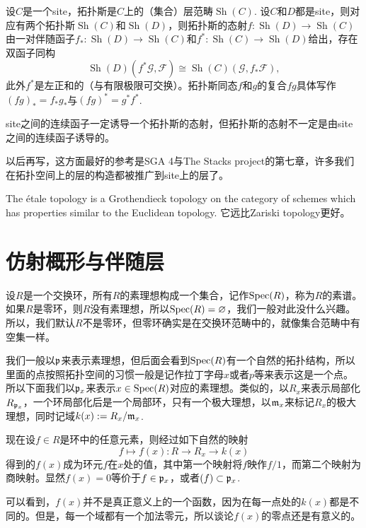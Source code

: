\begin{para}[拓扑斯]
	设$C$是一个site，拓扑斯是$C$上的（集合）层范畴$\operatorname{Sh}(C)$. 设$C$和$D$都是site，则对应有两个拓扑斯$\operatorname{Sh}(C)$和$\operatorname{Sh}(D)$，则拓扑斯的态射$f:\operatorname{Sh}(D)\to \operatorname{Sh}(C)$由一对伴随函子$f_*:\operatorname{Sh}(D)\to \operatorname{Sh}(C)$和$f^*:\operatorname{Sh}(C)\to \operatorname{Sh}(D)$给出，存在双函子同构
	\[
		\operatorname{Sh}(D)(f^*\mathcal G,\mathcal F)\cong \operatorname{Sh}(C)(\mathcal G,f_*\mathcal F),
	\]
	此外$f^*$是左正和的（与有限极限可交换）。拓扑斯同态$f$和$g$的复合$fg$具体写作$(fg)_*=f_* g_*$与$(fg)^*=g^*f^*$.
\end{para}

site之间的连续函子一定诱导一个拓扑斯的态射，但拓扑斯的态射不一定是由site之间的连续函子诱导的。

\vspace{2cm}

以后再写，这方面最好的参考是SGA 4与The Stacks project的第七章，许多我们在拓扑空间上的层的构造都被推广到site上的层了。

The étale topology is a Grothendieck topology on the category of schemes which has properties similar to the Euclidean topology. 它远比Zariski topology更好。

\section{仿射概形与伴随层}

\para 设$R$是一个交换环，所有$R$的素理想构成一个集合，记作$\operatorname{Spec}(R)$，称为$R$的素谱。如果$R$是零环，则$R$没有素理想，所以$\operatorname{Spec}(R)=\varnothing$，我们一般对此没什么兴趣。所以，我们默认$R$不是零环，但零环确实是在交换环范畴中的，就像集合范畴中有空集一样。

我们一般以$\mathfrak{p}$来表示素理想，但后面会看到$\operatorname{Spec}(R)$有一个自然的拓扑结构，所以里面的点按照拓扑空间的习惯一般是记作拉丁字母$x$或者$p$等来表示这是一个点。所以下面我们以$\mathfrak{p}_x$来表示$x\in \operatorname{Spec}(R)$对应的素理想。类似的，以$R_x$来表示局部化$R_{\mathfrak{p}_x}$，一个环局部化后是一个局部环，只有一个极大理想，以$\mathfrak{m}_x$来标记$R_x$的极大理想，同时记域$k(x):=R_x/\mathfrak{m}_x$.

\para 现在设$f\in R$是环中的任意元素，则经过如下自然的映射
\[
	f\mapsto f(x):R\to R_x\to k(x)
\]
得到的$f(x)$成为环元$f$在$x$处的值，其中第一个映射将$f$映作$f/1$，而第二个映射为商映射。显然$f(x)=0$等价于$f\in \mathfrak{p}_x$，或者$(f)\subset \mathfrak{p}_x$.

可以看到，$f(x)$并不是真正意义上的一个函数，因为在每一点处的$k(x)$都是不同的。但是，每一个域都有一个加法零元，所以谈论$f(x)$的零点还是有意义的。

